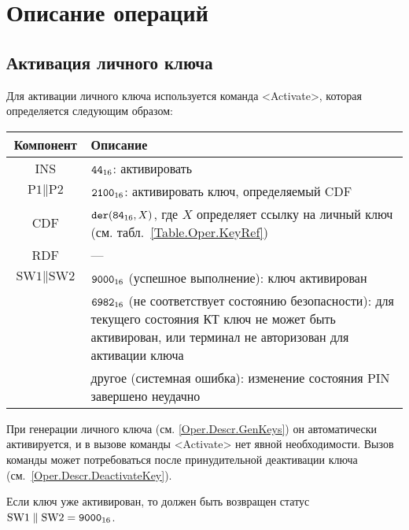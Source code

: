 \clearpage

\section{Описание операций}\label{Oper.Descr}

\subsection{Активация личного ключа}\label{Oper.Descr.ActivateKey}

Для активации личного ключа используется команда <Activate>,
которая определяется следующим образом:

\noindent
\begin{tabular}{|c|p{14cm}|}
\hline
Компонент & Описание\\
\hline
\hline
INS & $\texttt{44}_{16}$: активировать\\
\hline
$\text{P1} \parallel \text{P2}$ & $\texttt{2100}_{16}$: 
активировать ключ, определяемый CDF\\
\hline
CDF &  $\texttt{der}(\texttt{84}_{16}, X)$,   
где $X$ определяет ссылку на личный ключ 
(см. табл.~\ref{Table.Oper.KeyRef}) \\ 
\hline \hline
RDF &  --- \\
\hline
$\text{SW1} \parallel \text{SW2}$ & 
$\texttt{9000}_{16}$ (успешное выполнение): ключ активирован\\
 & $\texttt{6982}_{16}$ (не соответствует состоянию безопасности): 
для текущего состояния КТ ключ не может быть активирован, 
или терминал не авторизован для активации ключа\\
 & другое (системная ошибка): изменение состояния PIN завершено 
неудачно\\
\hline
\end{tabular}

При генерации личного ключа (см. \ref{Oper.Descr.GenKeys})
он автоматически активируется, 
и в вызове команды <Activate> нет явной необходимости. 
Вызов команды может потребоваться после 
принудительной деактивации ключа (см.~\ref{Oper.Descr.DeactivateKey}).  

Если ключ уже активирован, то должен быть 
возвращен статус $\text{SW1} \parallel \text{SW2} = \texttt{9000}_{16}$.

